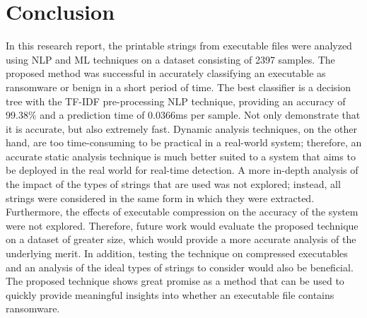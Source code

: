 \documentclass[conference]{IEEEtran}
\begin{document}
\section{Conclusion}
In this research report, the printable strings from executable files were analyzed using NLP and ML techniques on a dataset consisting of 2397 samples. The proposed method was successful in accurately classifying an executable as ransomware or benign in a short period of time. The best classifier is a decision tree with the TF-IDF pre-processing NLP technique, providing an accuracy of 99.38\% and a prediction time of 0.0366ms per sample. Not only demonstrate that it is accurate, but also extremely fast. Dynamic analysis techniques, on the other hand, are too time-consuming to be practical in a real-world system; therefore, an accurate static analysis technique is much better suited to a system that aims to be deployed in the real world for real-time detection. A more in-depth analysis of the impact of the types of strings that are used was not explored; instead, all strings were considered in the same form in which they were extracted. Furthermore, the effects of executable compression on the accuracy of the system were not explored. Therefore, future work would evaluate the proposed technique on a dataset of greater size, which would provide a more accurate analysis of the underlying merit. In addition, testing the technique on compressed executables and an analysis of the ideal types of strings to consider would also be beneficial. The proposed technique shows great promise as a method that can be used to quickly provide meaningful insights into whether an executable file contains ransomware.





\end{document}
